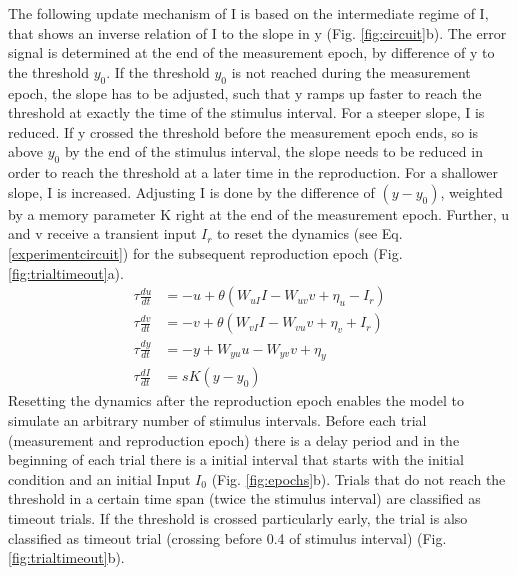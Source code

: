 \documentclass[9pt]{article}
\begin{document}
The following update mechanism of I is based on the intermediate regime of I, that shows an inverse relation of I to the slope in y (Fig. \ref{fig:circuit}b).
The error signal is determined at the end of the measurement epoch, by difference of y to the threshold $y_0$.
If the threshold $y_0$ is not reached during the measurement epoch, the slope has to be adjusted, such that y ramps up faster to reach the threshold at exactly the time of the stimulus interval. For a steeper slope, I is reduced.
If y crossed the threshold before the measurement epoch ends, so is above $y_0$ by the end of the stimulus interval, the slope needs to be reduced in order to reach the threshold at a later time in the reproduction. For a shallower slope, I is increased.
Adjusting I is done by the difference of $(y-y_0)$, weighted by a memory parameter K right at the end of the measurement epoch. 
Further, u and v receive a transient input $I_r$ to reset the dynamics (see Eq. \ref{experimentcircuit}) for the subsequent reproduction epoch (Fig. \ref{fig:trialtimeout}a).
\begin{equation} \label{experimentcircuit}
	\begin{split}
	\tau\frac{du}{dt} & = -u + \theta(W_{uI}I - W_{uv}v + \eta_u - I_r) \\
	\tau\frac{dv}{dt} & = -v + \theta(W_{vI}I - W_{vu}v + \eta_v + I_r) \\
	\tau\frac{dy}{dt} & = -y + W_{yu}u - W_{yv}v + \eta_y \\
	\tau\frac{dI}{dt} & = sK(y-y_0)
	\end{split}
\end{equation}
Resetting the dynamics after the reproduction epoch enables the model to simulate an arbitrary number of stimulus intervals. Before each trial (measurement and reproduction epoch) there is a delay period and in the beginning of each trial there is a initial interval that starts with the initial condition and an initial Input $I_0$ (Fig. \ref{fig:epochs}b).
Trials that do not reach the threshold in a certain time span (twice the stimulus interval) are classified as timeout trials. If the threshold is crossed particularly early, the trial is also classified as timeout trial (crossing before 0.4 of stimulus interval) (Fig. \ref{fig:trialtimeout}b).
\end{document}
